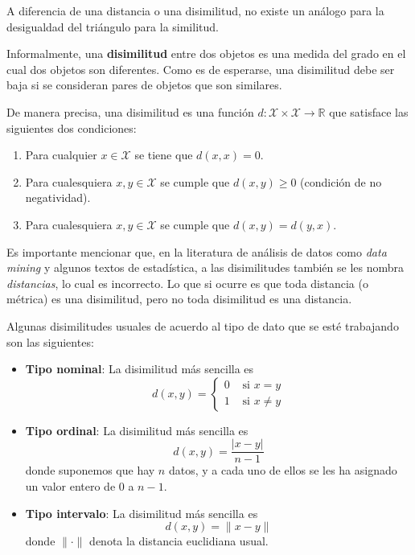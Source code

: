\documentclass[
]{book}
\begin{document}
A diferencia de una distancia o una disimilitud, no existe un análogo para la desigualdad del triángulo para la similitud.

Informalmente, una \textbf{disimilitud} entre dos objetos es una medida del grado en el cual dos objetos son diferentes. Como es de esperarse, una disimilitud debe ser baja si se consideran pares de objetos que son similares.

De manera precisa, una disimilitud es una función \(d: \mathcal{X}\times \mathcal{X} \to \mathbb{R}\) que satisface las siguientes dos condiciones:

\begin{enumerate}
\def\labelenumi{\arabic{enumi})}
\item
  Para cualquier \(x\in\mathcal{X}\) se tiene que \(d(x,x) = 0\).
\item
  Para cualesquiera \(x,y \in \mathcal{X}\) se cumple que \(d(x,y)\geq 0\) (condición de no negatividad).
\item
  Para cualesquiera \(x,y\in\mathcal{X}\) se cumple que \(d(x,y) = d(y,x)\).
\end{enumerate}

Es importante mencionar que, en la literatura de análisis de datos como \emph{data mining} y algunos textos de estadística, a las disimilitudes también se les nombra \emph{distancias}, lo cual es incorrecto. Lo que si ocurre es que toda distancia (o métrica) es una disimilitud, pero no toda disimilitud es una distancia.

Algunas disimilitudes usuales de acuerdo al tipo de dato que se esté trabajando son las siguientes:

\begin{itemize}
\item
  \textbf{Tipo nominal}: La disimilitud más sencilla es
  \[
    d(x,y) = \left\{
      \begin{matrix}
      0 & \text{ si } x= y \\
      1 & \text{ si } x\neq y
      \end{matrix}
    \right.
    \]
\item
  \textbf{Tipo ordinal}: La disimilitud más sencilla es
  \[
  d(x,y) = \frac{|x-y|}{n-1}
    \]
  donde suponemos que hay \(n\) datos, y a cada uno de ellos se les ha asignado un valor entero de \(0\) a \(n-1\).
\item
  \textbf{Tipo intervalo}: La disimilitud más sencilla es
  \[
  d(x,y) = \| x- y\|
    \]
  donde \(\| \cdot \|\) denota la distancia euclidiana usual.
\end{itemize}
\end{document}
